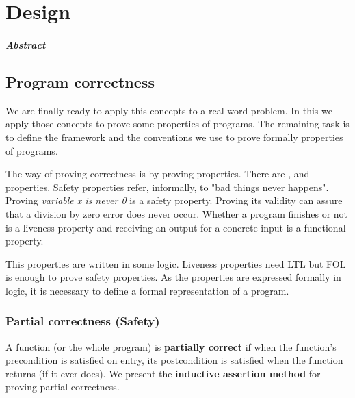 \chapter{Design\label{chap:design}}

\paragraph{Abstract} 



\section{Program correctness}


We are finally ready to apply this concepts to a real word problem. In this \thisworkm we apply those concepts to prove some properties of programs.
%
The remaining task is to define the framework and the conventions we use to prove formally properties of programs.

The way of proving correctness is by proving properties. 
%
There are ,  and  properties. 
%
Safety properties refer, informally, to "bad things never happens". Proving \textit{ variable x is never 0 } is a safety property. 
%
Proving its validity can assure that a division by zero error does never occur. 
%
Whether a program finishes or not is a liveness property and receiving an output for a concrete input is a functional property. 

This properties are written in some logic. Liveness properties need \gls{LTL} but \gls{FOL} is enough to prove safety properties. 
%
As the properties are expressed formally in logic, it is necessary to define a formal representation of a program.


\label{def:SPL}



\subsection{Partial correctness (Safety)}

A function (or the whole program) is \textbf{partially correct} if when the function's precondition is satisfied on entry, its postcondition is satisfied when the function returns (if it ever does).
%
We present the \textbf{inductive assertion method} for proving partial correctness.


